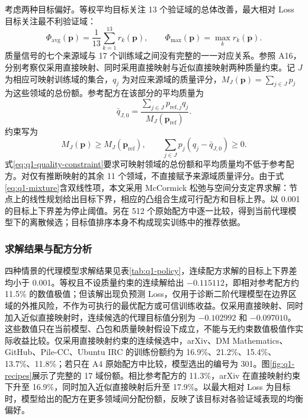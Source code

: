 考虑两种目标偏好。等权平均目标关注 13 个验证域的总体改善，最大相对 Loss 目标关注最不利验证域：
\begin{equation}
 \Phi_{\mathrm{avg}}(\boldsymbol p)=\frac1{13}\sum_{k=1}^{13}r_k(\boldsymbol p),
 \qquad \Phi_{\mathrm{max}}(\boldsymbol p)=\max_k r_k(\boldsymbol p).
 \label{eq:q1-objectives}
\end{equation}
质量信号的七个来源域与 17 个训练域之间没有完整的一一对应关系。参照 A16，分别考察仅采用直接映射、同时采用直接映射与近似直接映射两种质量约束。记 $J$ 为相应可映射训练域的集合，$q_j$ 为对应来源域的质量评分，$M_J(\boldsymbol p)=\sum_{j\in J}p_j$ 为这些领域的总份额。参考配方在该部分的平均质量为
\begin{equation}
 \bar q_{J,0}=
 \frac{\sum_{j\in J}p_{\mathrm{ref},j}q_j}
 {M_J(\boldsymbol p_{\mathrm{ref}})}.
 \label{eq:q1-reference-quality}
\end{equation}
约束写为
\begin{equation}
 M_J(\boldsymbol p)\geqslant M_J(\boldsymbol p_{\mathrm{ref}}),\qquad
 \sum_{j\in J}p_j(q_j-\bar q_{J,0})\geqslant0.
 \label{eq:q1-quality-constraint}
\end{equation}
式\eqref{eq:q1-quality-constraint}要求可映射领域的总份额和平均质量均不低于参考配方。对仅有推断映射的其余 11 个领域，不直接赋予来源域质量评分。由于式\eqref{eq:q1-mixture}含双线性项，本文采用 McCormick 松弛与空间分支定界求解\cite{global2025}：节点上的线性规划给出目标下界，相应的凸组合生成可行配方和目标上界。以 0.001 的目标上下界差为停止阈值。另在 512 个原始配方中逐一比较，得到当前代理模型下的离散候选；目标值排序本身不构成现实训练中的推荐依据。

\subsubsection{求解结果与配方分析}

四种情景的代理模型求解结果见表\ref{tab:q1-policy}，连续配方求解的目标上下界差均小于 0.001。等权且不设质量约束的连续解给出 $-0.115112$，即相对参考配方约 11.5\% 的数值极值；但该解出现负预测 Loss，仅用于诊断二阶代理模型在边界区域的外推风险，不作为可执行的最优配方或可信训练收益。仅采用直接映射、同时加入近似直接映射时，连续候选的代理目标值分别为 $-0.102992$ 和 $-0.097010$。这些数值只在当前模型、凸包和质量映射假设下成立，不能与无约束数值极值作实际收益比较。仅采用直接映射约束的连续候选中，arXiv、DM Mathematics、GitHub、Pile-CC、Ubuntu IRC 的训练份额约为 16.9\%、21.2\%、15.4\%、13.7\%、11.8\%；若只在 A4 原始配方中比较，模型选出的编号为 301。图\ref{fig:q1-recipes}展示了完整的 17 域份额。相比参考配方的 11.3\%，arXiv 在直接映射约束下升至 16.9\%，同时加入近似直接映射后升至 17.9\%。以最大相对 Loss 为目标时，模型给出的配方在更多领域间分配份额，反映了该目标对各验证域表现的均衡偏好。

